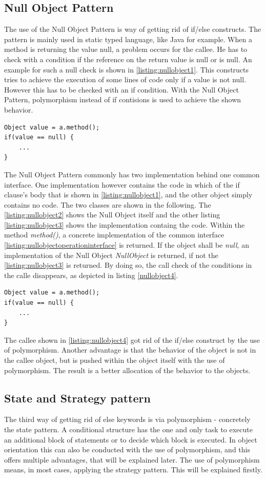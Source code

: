\subsection*{Null Object Pattern}
The use of the Null Object Pattern is way of getting rid of if/else constructs. The pattern is mainly used in static typed language, like Java for example. When a method is returning the value null, a problem occurs for the callee. He has to check with a condition if the reference on the return value is null or is null. An example for such a null check is shown in \ref{listing:nullobject1}. This constructs tries to achieve the execution of some lines of code only if a value is not null. However this has to be checked with an if condition. With the Null Object Pattern, polymorphism instead of if contisions is used to achieve the shown behavior.
\begin{lstlisting}
Object value = a.method();
if(value == null) {
	...
}
\end{lstlisting}
\label{listing:nullobject1}
The Null Object Pattern commonly has two implementation behind one common interface. One implementation however contains the code in which of the if clause's body that is shown in \ref{listing:nullobject1}, and the other object simply contains no code. The two classes are shown in the following. The \ref{listing:nullobject2} shows the Null Object itself and the other listing \ref{listing:nullobject3} shows the implementation containg the code. Within the method \textit{method()}, a concrete implementation of the common interface \ref{listing:nullobjectoperationinterface} is returned. If the object shall be \textit{null}, an implementation of the Null Object \textit{NullObject} is returned, if not the \ref{listing:nullobject3} is returned. By doing so, the call check of the conditions in the calle disappears, as depicted in listing \ref{nullobject4}.
\begin{lstlisting}
Object value = a.method();
if(value == null) {
	...
}
\end{lstlisting}
\label{listing:nullobject4}

The callee shown in \ref{listing:nullobject4} got rid of the if/else construct by the use of polymorphism. Another advantage is that the behavior of the object is not in the callee object, but is pushed within the object itself with the use of polymorphism. The result is a better allocation of the behavior to the objects.
\\

\subsection*{State and Strategy pattern}
The third way of getting rid of else keywords is via polymorphism - concretely the state pattern. A conditional structure has the one and only task to execute an additional block of statements or to decide which block is executed. In object orientation this can also be conducted with the use of polymorphism, and this offers multiple advantages, that will be explained later. 
The use of polymorphism means, in most cases, applying the strategy pattern. This will be explained firstly. \\

